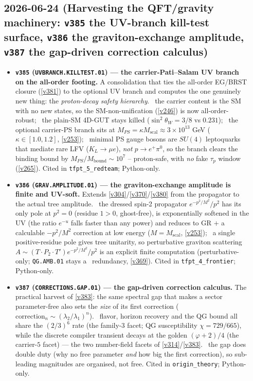 \subsection*{2026-06-24 (Harvesting the QFT/gravity machinery: \texttt{v385} the UV-branch kill-test surface, \texttt{v386} the graviton-exchange amplitude, \texttt{v387} the gap-driven correction calculus)}
\begin{itemize}
\item \textbf{\texttt{v385} (\texttt{UVBRANCH.KILLTEST.01}) --- the carrier-Pati--Salam UV branch on the all-order footing.}
A consolidation that ties the all-order EG/BRST closure (\vref{v381}) to the optional UV branch and computes the
one genuinely new thing: the \emph{proton-decay safety hierarchy}. \mE\ the carrier content is the SM with no new
states, so the SM-non-unification (\vref{v246}) is now all-order-robust; \mX\ the plain-SM 4D-GUT stays killed
($\sin^2\theta_W=3/8$ vs $0.231$); \mC\ the optional carrier-PS branch sits at $M_{PS}=\kappa M_{\mathrm{scal}}\approx
3\times10^{13}$ GeV ($\kappa\in[1.0,1.2]$, \vref{v253}); \mE\ minimal PS gauge bosons are $SU(4)$ leptoquarks that
mediate rare LFV ($K_L\to\mu e$), \emph{not} $p\to e^+\pi^0$, so the branch clears the binding bound by
$M_{PS}/M_{\mathrm{bound}}\sim10^7$ -- proton-safe, with \emph{no} fake $\tau_p$ window (\vref{v265}). Cited in
\texttt{tfpt\_5\_redteam}; Python-only.
\item \textbf{\texttt{v386} (\texttt{GRAV.AMPLITUDE.01}) --- the graviton-exchange amplitude is finite and UV-soft.}
Extends \vref{v304}/\vref{v370}/\vref{v380} from the propagator to the actual tree amplitude. \mE\ the dressed spin-2
propagator $e^{-p^2/M^2}/p^2$ has its only pole at $p^2=0$ (residue $1>0$, ghost-free), is exponentially softened in
the UV (the ratio $e^{-u}$ falls faster than any power) and reduces to GR $+$ a calculable $-p^2/M^2$ correction at
low energy ($M=M_{\mathrm{scal}}$, \vref{v253}); \mC\ a single positive-residue pole gives tree unitarity, so
perturbative graviton scattering $A\sim(T{\cdot}P_2{\cdot}T')e^{-p^2/M^2}/p^2$ is an explicit finite computation
(perturbative-only; \texttt{QG.AMB.01} stays a \mC\ redundancy, \vref{v369}). Cited in \texttt{tfpt\_4\_frontier};
Python-only.
\item \textbf{\texttt{v387} (\texttt{CORRECTIONS.GAP.01}) --- the gap-driven correction calculus.}
The practical harvest of \vref{v383}: the same spectral gap that makes a sector parameter-free also sets the
\emph{size} of its first correction ($\mathrm{correction}_n\sim(\lambda_2/\lambda_1)^n$). \mE\ flavor, horizon
recovery and the QG bound all share the $(2/3)^6$ rate (the family-$3$ facet; QG susceptibility
$\chi=729/665$), while the discrete compiler transient decays at the golden $(\varphi+2)/4$ (the carrier-$5$ facet)
--- the two number-field facets of \vref{v314}/\vref{v383}. \mC\ the gap does double duty (why no free parameter
\emph{and} how big the first correction), so sub-leading magnitudes are organised, not free. Cited in
\texttt{origin\_theory}; Python-only.
\end{itemize}

